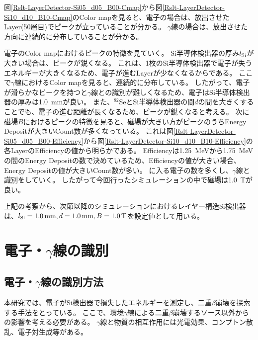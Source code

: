 \documentclass[a4paper,10pt]{jreport}
\begin{document}
図\ref{Rslt-LayerDetector-Si05_d05_B00-Cmap}から図\ref{Rslt-LayerDetector-Si10_d10_B10-Cmap}のColor mapを見ると、電子の場合は、放出させたLayer(50層目)でピークが立っていることが分かる。
$\gamma$線の場合は、放出させた方向に連続的に分布していることが分かる。

電子のColor mapにおけるピークの特徴を見ていく。
Si半導体検出器の厚み$l_{\rm{Si}}$が大きい場合は、ピークが鋭くなる。
これは、1枚のSi半導体検出器で電子が失うエネルギーが大きくなるため、電子が進むLayerが少なくなるからである。
ここで$\gamma$線におけるColor mapを見ると、連続的に分布している。
したがって、電子が滑らかなピークを持つと$\gamma$線との識別が難しくなるため、電子はSi半導体検出器の厚みは\SI{1.0}{mm}が良い。
また、$^{82}$SeとSi半導体検出器の間$d$の間を大きくすることでも、電子の進む距離が長くなるため、ピークが鋭くなると考える。
次に磁場$B$におけるピークの特徴を見ると、磁場が大きい方がピークのうちEnergy Depositが大きいCount数が多くなっている。
これは図\ref{Rslt-LayerDetector-Si05_d05_B00-Efficiency}から図\ref{Rslt-LayerDetector-Si10_d10_B10-Efficiency}の各LayerのEfficiencyの値から明らかである。
Efficiencyは\SI{1.25}{MeV}から\SI{1.75}{MeV}の間のEnergy Depositの数で決めているため、Efficiencyの値が大きい場合、Energy Depositの値が大きいCount数が多い。
に入る電子の数を多くし、$\gamma$線と識別をしていく。
したがって今回行ったシミュレーションの中で磁場は\SI{1.0}{T}が良い。

上記の考察から、次節以降のシミュレーションにおけるレイヤー構造Si検出器は、$l_{\rm{Si}}=\SI{1.0}{mm}, d=\SI{1.0}{mm}, B=\SI{1.0}{T}$を設定値として用いる。




\chapter{電子・$\gamma$線の識別}




\section{電子・$\gamma$線の識別方法}

本研究では、電子がSi検出器で損失したエネルギーを測定し、二重$\beta$崩壊を探索する手法をとっている。
ここで、環境$\gamma$線による二重$\beta$崩壊するソース以外からの影響を考える必要がある。
$\gamma$線と物質の相互作用には光電効果、コンプトン散乱、電子対生成等がある。
\end{document}

